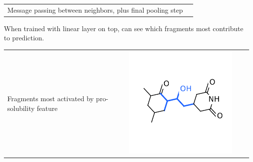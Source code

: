 \documentclass[landscape,a0b,final,a4resizeable]{include/a0poster}
\begin{document}
\begin{poster}
\begin{multicols}{3}
\begin{tabular}{cc}
\begin{minipage}[c]{0.4\columnwidth}
Message passing between neighbors, plus final pooling step

\end{minipage}
\end{tabular}

\vspace{0.5in}


\newcommand{\mywidtha}{8cm}
\newcommand{\mywidthb}{10cm}

When trained with linear layer on top, can see which fragments most contribute to prediction.

\begin{center}
\vspace{-1em}
\begin{tabular}{>{\centering}m{\mywidthb} >{\centering}m{\mywidtha} >{\centering}m{\mywidtha} >{\centering\arraybackslash}m{\mywidtha}}
Fragments most activated by pro-solubility feature & 
\includegraphics[width=\mywidtha, clip, trim = 2mm 3mm 2mm 6mm]{figures/fig_5.pdf}\vspace{-1em} &

\end{tabular}
\end{center}
\end{multicols}
\end{poster}
\end{document}

